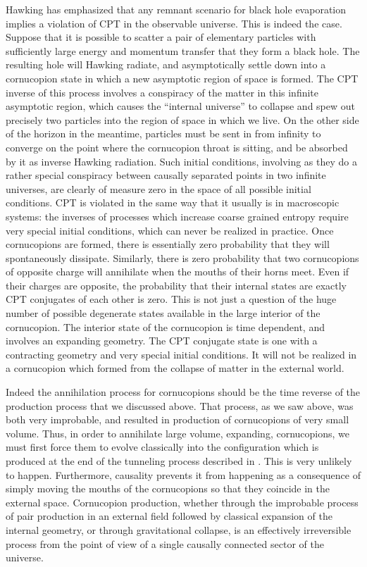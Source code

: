Hawking has emphasized that any remnant scenario for black hole
evaporation implies a violation
of CPT in the observable universe.  This is indeed the case.
Suppose that it is possible to scatter a pair of elementary particles with
sufficiently
large energy and momentum transfer that they form a black hole.  The
resulting hole will Hawking radiate, and asymptotically settle down into
a cornucopion state in which a new asymptotic region of space is formed.
The CPT inverse of this process involves a conspiracy of the matter in
this infinite asymptotic region, which causes the ``internal universe''
to collapse and spew out precisely two particles into the region of
space in which we live.  On the other side of the horizon in the
meantime, particles must be sent in from infinity to converge on the point
where the cornucopion throat is sitting, and be absorbed by it as
inverse Hawking radiation.
Such initial conditions, involving as they do a rather special
conspiracy between causally separated points in two infinite universes,
are clearly of measure zero in the space of all possible initial
conditions.  CPT is violated in the same way that it
usually is in macroscopic systems: the inverses of processes which
increase coarse grained entropy require very special initial conditions,
which can never be realized in practice.
Once cornucopions are formed, there is essentially
zero probability that they will spontaneously dissipate.  Similarly, there is
zero probability that two cornucopions of opposite charge will annihilate
when the mouths of their horns meet.  Even if their charges
are opposite, the probability that their internal states
are exactly CPT conjugates of each other is zero.  This is not just a question
of the huge number of possible degenerate states available in the large
interior
of the cornucopion.  The interior state of the cornucopion is time dependent,
and involves an expanding geometry.  The CPT conjugate state is one with a
contracting geometry and very special initial conditions.  It will not
be realized in a cornucopion which formed from the collapse of matter in the
external world.

Indeed the annihilation process for cornucopions should be the time reverse of
the production process that we discussed above.  That process, as we saw
above, was both very improbable, and resulted in production of cornucopions of
very small volume.   Thus, in order to annihilate large volume, expanding,
cornucopions, we must first force them to evolve classically into the
configuration  which is produced at the end of the tunneling process described
in \bos .  This is very unlikely to happen.  Furthermore, causality prevents
it from happening as a consequence of simply moving the mouths of the
cornucopions so that they coincide in the external space.
Cornucopion production, whether through the improbable process of
pair production in an
external field followed by classical expansion of the internal
geometry, or through gravitational collapse, is an effectively irreversible
process from the point of view of a single causally connected sector of
the universe.

